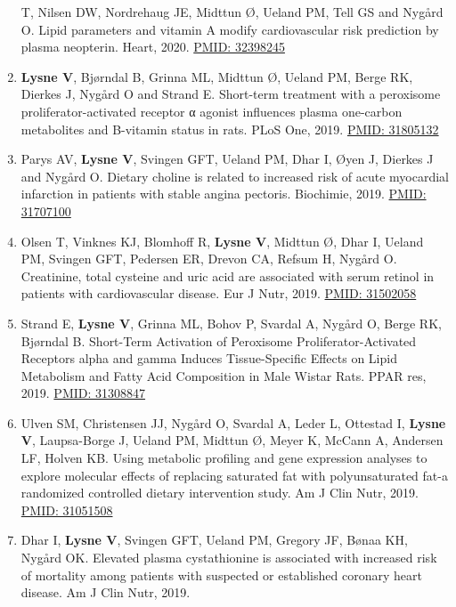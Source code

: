 \documentclass[11pt, a4paper]{awesome-cv}
\begin{document}
\begin{enumerate}
  T, Nilsen DW, Nordrehaug JE, Midttun Ø, Ueland PM, Tell GS and Nygård
  O. Lipid parameters and vitamin A modify cardiovascular risk
  prediction by plasma neopterin. Heart, 2020.
  \href{https://pubmed.ncbi.nlm.nih.gov/32398245/}{PMID: 32398245}
\item
  \textbf{Lysne V}, Bjørndal B, Grinna ML, Midttun Ø, Ueland PM, Berge
  RK, Dierkes J, Nygård O and Strand E. Short-term treatment with a
  peroxisome proliferator-activated receptor α agonist influences plasma
  one-carbon metabolites and B-vitamin status in rats. PLoS One, 2019.
  \href{https://www.ncbi.nlm.nih.gov/pubmed/31805132}{PMID: 31805132}
\item
  Parys AV, \textbf{Lysne V}, Svingen GFT, Ueland PM, Dhar I, Øyen J,
  Dierkes J and Nygård O. Dietary choline is related to increased risk
  of acute myocardial infarction in patients with stable angina
  pectoris. Biochimie, 2019.
  \href{https://www.ncbi.nlm.nih.gov/pubmed/31707100}{PMID: 31707100}
\item
  Olsen T, Vinknes KJ, Blomhoff R, \textbf{Lysne V}, Midttun Ø, Dhar I,
  Ueland PM, Svingen GFT, Pedersen ER, Drevon CA, Refsum H, Nygård O.
  Creatinine, total cysteine and uric acid are associated with serum
  retinol in patients with cardiovascular disease. Eur J Nutr, 2019.
  \href{https://www.ncbi.nlm.nih.gov/pubmed/31502058}{PMID: 31502058}
\item
  Strand E, \textbf{Lysne V}, Grinna ML, Bohov P, Svardal A, Nygård O,
  Berge RK, Bjørndal B. Short-Term Activation of Peroxisome
  Proliferator-Activated Receptors alpha and gamma Induces
  Tissue-Specific Effects on Lipid Metabolism and Fatty Acid Composition
  in Male Wistar Rats. PPAR res, 2019.
  \href{https://www.ncbi.nlm.nih.gov/pubmed/31308847}{PMID: 31308847}
\item
  Ulven SM, Christensen JJ, Nygård O, Svardal A, Leder L, Ottestad I,
  \textbf{Lysne V}, Laupsa-Borge J, Ueland PM, Midttun Ø, Meyer K,
  McCann A, Andersen LF, Holven KB. Using metabolic profiling and gene
  expression analyses to explore molecular effects of replacing
  saturated fat with polyunsaturated fat-a randomized controlled dietary
  intervention study. Am J Clin Nutr, 2019.
  \href{https://www.ncbi.nlm.nih.gov/pubmed/31051508}{PMID: 31051508}
\item
  Dhar I, \textbf{Lysne V}, Svingen GFT, Ueland PM, Gregory JF, Bønaa
  KH, Nygård OK. Elevated plasma cystathionine is associated with
  increased risk of mortality among patients with suspected or
  established coronary heart disease. Am J Clin Nutr, 2019.

\end{enumerate}
\end{document}
